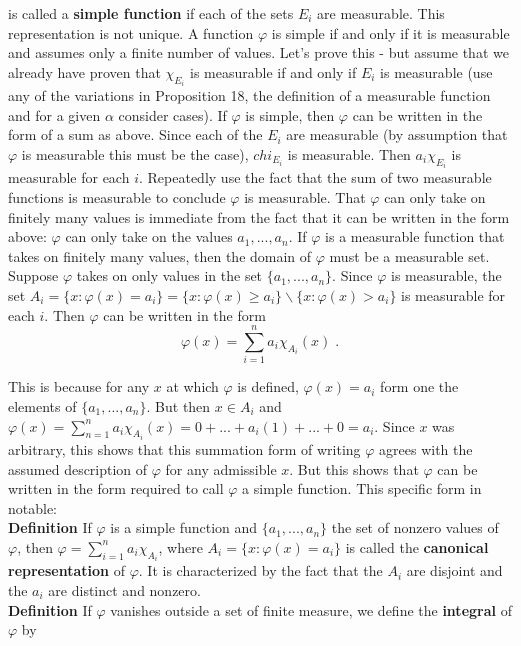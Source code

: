 \documentclass[a4paper]{article}
\begin{document}
is called a {\bf simple function} if each of the sets $E_i$ are measurable. This representation is not unique. A function $\varphi$ is simple if and only if it is measurable and assumes only a finite number of values. Let's prove this - but assume that we already have proven that $\chi_{E_i}$ is measurable if and only if $E_i$ is measurable (use any of the variations in Proposition 18, the definition of a measurable function and for a given $\alpha$ consider cases). If $\varphi$ is simple, then $\varphi$ can be written in the form of a sum as above. Since each of the $E_i$ are measurable (by assumption that $\varphi$ is measurable this must be the case), $chi_{E_i}$ is measurable. Then $a_i\chi_{E_i}$ is measurable for each $i$. Repeatedly use the fact that the sum of two measurable functions is measurable to conclude $\varphi$ is measurable. That $\varphi$ can only take on finitely many values is immediate from the fact that it can be written in the form above: $\varphi$ can only take on the values $a_1,...,a_n$. If $\varphi$ is a measurable function that takes on finitely many values, then the domain of $\varphi$ must be a measurable set. Suppose $\varphi$ takes on only values in the set $\{a_1,...,a_n\}$. Since $\varphi$ is measurable, the set $A_i = \{x : \varphi(x) = a_i\} = \{x : \varphi(x) \geq a_i \} \backslash \{x : \varphi(x) > a_i\}$ is measurable for each $i$. Then $\varphi$ can be written in the form 
$$\varphi(x) = \sum_{i=1}^n a_i \chi_{A_i}(x) \;.$$

This is because for any $x$ at which $\varphi$ is defined, $\varphi(x) = a_i$ form one the elements of $\{a_1,...,a_n\}$. But then $x \in A_i$ and $\varphi(x) = \sum_{n=1}^n a_i\chi_{A_i}(x) = 0 + ... + a_i(1) + ... +0 = a_i$. Since $x$ was arbitrary, this shows that this summation form of writing $\varphi$ agrees with the assumed description of $\varphi$ for any admissible $x$. But this shows that $\varphi$ can be written in the form required to call $\varphi$ a simple function. This specific form in notable:\\

{\bf Definition} If $\varphi$ is a simple function and $\{a_1, ..., a_n\}$ the set of nonzero values of $\varphi$, then $\varphi = \sum_{i=1}^n a_i\chi_{A_i}$, where $A_i =\{x : \varphi(x) = a_i\}$ is called the {\bf canonical representation} of $\varphi$. It is characterized by the fact that the $A_i$ are disjoint and the $a_i$ are distinct and nonzero. \\

{\bf Definition} If $\varphi$ vanishes outside a set of finite measure, we define the {\bf integral} of $\varphi$ by 
\end{document}
